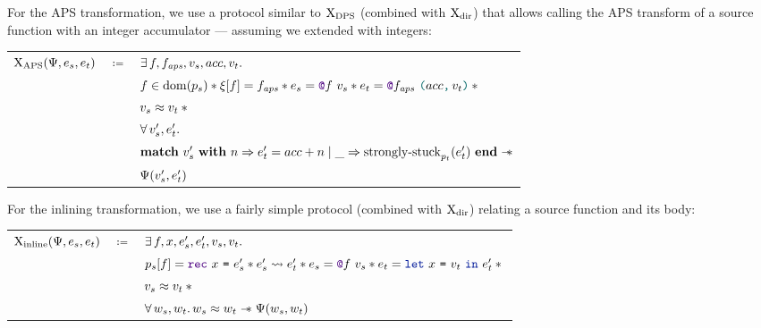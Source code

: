 For the APS transformation, we use a protocol similar to $\mathrm{X}_\mathrm{DPS}$ (combined with $\mathrm{X}_\mathrm{dir}$) that allows calling the APS transform of a source function with an integer accumulator --- assuming we extended \DataLang with integers:

\medskip
\begin{tabular}{rcl}
        $\iProt_\mathrm{APS} (\iPredTwo, \datalangExpr_s, \datalangExpr_t)$
        & $\coloneqq$ &
        $\exists \datalangFn, \datalangFn_\mathit{aps}, \datalangVal_s, acc, \datalangVal_t \ldotp$
    \\
        &&
        $\datalangFn \in \dom{\datalangProg_s} \iSep
        \datalangRenaming [\datalangFn] = \datalangFn_\mathit{aps} \iSep
        \datalangExpr_s = \datalangCall{\datalangFnptr{\datalangFn}}{\datalangVal_s} \iSep
        \datalangExpr_t = \datalangCall{\datalangFnptr{\datalangFn_\mathit{aps}}}{\datalangPair{acc}{\datalangVal_t}} \iSep {}$
    \\
        &&
        $\datalangVal_s \iSimilar \datalangVal_t \iSep {}$
    \\
        &&
        $\forall \datalangVal_s', \datalangExpr_t' \ldotp$
    \\
        &&
        $\bm{\mathrm{match}}\ \datalangVal_s'\ \bm{\mathrm{with}}\ \datalangNat \Rightarrow \datalangExpr_t' = acc + \datalangNat \mid \_ \Rightarrow \mathrm{strongly \mathhyphen stuck}_{\datalangProg_t} (\datalangExpr_t')\ \bm{\mathrm{end}} \iWand$
    \\
        &&
        $\iPredTwo (\datalangVal_s', \datalangExpr_t')$
\end{tabular}
\medskip

For the inlining transformation, we use a fairly simple protocol (combined with $\mathrm{X}_\mathrm{dir}$) relating a source function and its body:

\medskip
\begin{tabular}{rcl}
        $\iProt_\mathrm{inline} (\iPredTwo, \datalangExpr_s, \datalangExpr_t)$
        & $\coloneqq$ &
        $\exists \datalangFn, \datalangVar, \datalangExpr_s', \datalangExpr_t', \datalangVal_s, \datalangVal_t \ldotp$
    \\
        &&
        $\datalangProg_s [\datalangFn] = \datalangRec{\datalangVar}{\datalangExpr_s'} \iSep
        \datalangExpr_s' \rightsquigarrow \datalangExpr_t' \iSep
        \datalangExpr_s = \datalangCall{\datalangFnptr{\datalangFn}}{\datalangVal_s} \iSep
        \datalangExpr_t = \datalangLet{\datalangVar}{\datalangVal_t}{\datalangExpr_t'} \iSep {}$
    \\
        &&
        $\datalangVal_s \iSimilar \datalangVal_t \iSep {}$
    \\
        &&
        $\forall \datalangValTwo_s, \datalangValTwo_t \ldotp
        \datalangValTwo_s \iSimilar \datalangValTwo_t \iWand
        \iPredTwo (\datalangValTwo_s, \datalangValTwo_t)$
\end{tabular}
\medskip

